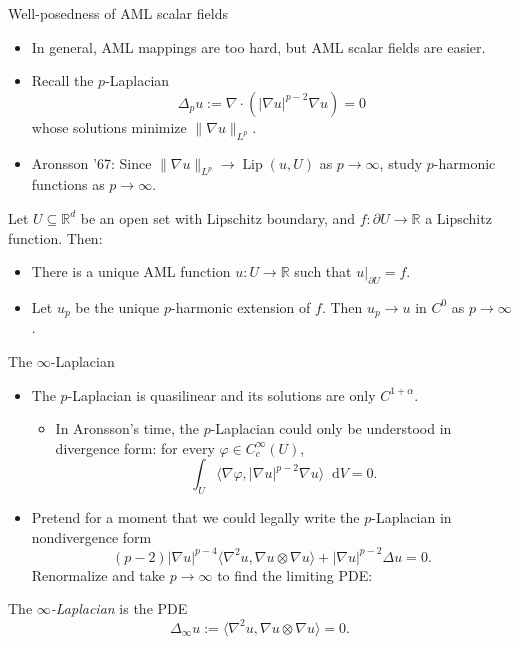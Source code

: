 \documentclass[10pt]{beamer}
\newcommand{\RR}{\mathbb{R}}
\newcommand*\dif{\mathop{}\!\mathrm{d}}
\DeclareMathOperator{\Lip}{Lip}
\begin{document}
\begin{frame}{Well-posedness of AML scalar fields}
\begin{itemize}
\item In general, AML mappings are too hard, but AML scalar fields are easier. 
\item Recall the $p$-Laplacian 
$$\Delta_p u := \nabla \cdot (|\nabla u|^{p - 2} \nabla u) = 0$$
whose solutions minimize $\|\nabla u\|_{L^p}$. 
\item Aronsson '67: Since $\|\nabla u\|_{L^p} \to \Lip(u, U)$ as $p \to \infty$, study $p$-harmonic functions as $p \to \infty$. 
\end{itemize}

\begin{theorem}[Jensen '93]
Let $U \subseteq \RR^d$ be an open set with Lipschitz boundary, and $f: \partial U \to \RR$ a Lipschitz function. Then: 
\begin{itemize}
\item There is a unique AML function $u: U \to \RR$ such that $u|_{\partial U} = f$. 
\item Let $u_p$ be the unique $p$-harmonic extension of $f$.
Then $u_p \to u$ in $C^0$ as $p \to \infty$.
\end{itemize}
\end{theorem}
\end{frame}

\begin{frame}{The $\infty$-Laplacian}
\begin{itemize}
\item The $p$-Laplacian is quasilinear and its solutions are only $C^{1 + \alpha}$.
\begin{itemize}
\item In Aronsson's time, the $p$-Laplacian could only be understood in divergence form: for every $\varphi \in C^\infty_c(U)$,
$$\int_U \langle \nabla \varphi, |\nabla u|^{p - 2} \nabla u\rangle \dif V = 0.$$
\end{itemize}
\item Pretend for a moment that we could legally write the $p$-Laplacian in nondivergence form 
$$(p - 2) |\nabla u|^{p - 4} \langle \nabla^2 u, \nabla u \otimes \nabla u\rangle + |\nabla u|^{p - 2} \Delta u = 0.$$
Renormalize and take $p \to \infty$ to find the limiting PDE: 
\end{itemize} 

\begin{definition}
The \emph{$\infty$-Laplacian} is the PDE 
$$\Delta_\infty u := \langle \nabla^2 u, \nabla u \otimes \nabla u\rangle = 0.$$
\end{definition}
\end{frame}
\end{document}
